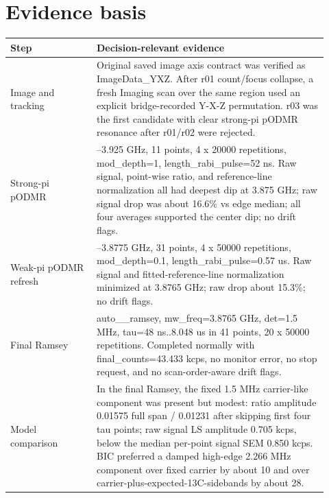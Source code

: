 \documentclass[10pt]{article}
\begin{document}
\section*{Evidence basis}
\begin{tabular}{>{\raggedright\arraybackslash}p{0.25\linewidth} >{\raggedright\arraybackslash}p{0.67\linewidth}}
\toprule
Step & Decision-relevant evidence \\
\midrule
Image and tracking & Original saved image axis contract was verified as ImageData\_YXZ. After r01 count/focus collapse, a fresh Imaging scan over the same region used an explicit bridge-recorded Y-X-Z permutation. r03 was the first candidate with clear strong-pi pODMR resonance after r01/r02 were rejected. \\
Strong-pi pODMR & 3.825--3.925 GHz, 11 points, 4 x 20000 repetitions, mod\_depth=1, length\_rabi\_pulse=52 ns. Raw signal, point-wise ratio, and reference-line normalization all had deepest dip at 3.875 GHz; raw signal drop was about 16.6\% vs edge median; all four averages supported the center dip; no drift flags. \\
Weak-pi pODMR refresh & 3.8745--3.8775 GHz, 31 points, 4 x 50000 repetitions, mod\_depth=0.1, length\_rabi\_pulse=0.57 us. Raw signal and fitted-reference-line normalization minimized at 3.8765 GHz; raw drop about 15.3\%; no drift flags. \\
Final Ramsey & auto\_\_ramsey, mw\_freq=3.8765 GHz, det=1.5 MHz, tau=48 ns..8.048 us in 41 points, 20 x 50000 repetitions. Completed normally with final\_counts=43.433 kcps, no monitor error, no stop request, and no scan-order-aware drift flags. \\
Model comparison & In the final Ramsey, the fixed 1.5 MHz carrier-like component was present but modest: ratio amplitude 0.01575 full span / 0.01231 after skipping first four tau points; raw signal LS amplitude 0.705 kcps, below the median per-point signal SEM 0.850 kcps. BIC preferred a damped high-edge 2.266 MHz component over fixed carrier by about 10 and over carrier-plus-expected-13C-sidebands by about 28. \\
\bottomrule
\end{tabular}
\end{document}
